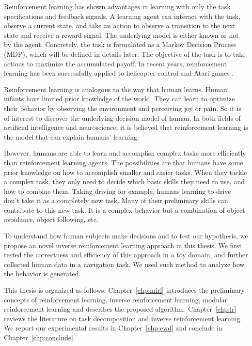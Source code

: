 Reinforcement learning has shown advantages in learning with only the task
specifications and feedback signals. A learning agent can interact with the
task, observe a current state, and take an action to observe a
transition to the next state and receive a reward signal. The underlying model is either
known or not by the agent. Concretely, the task is formulated as a
Markov Decision Process (MDP), which will be defined in details later.
The objective of the task is to take actions to maximize the accumulated payoff.
In recent years, reinforcement learning has been successfully applied to
helicopter control \cite{ng2006autonomous} and Atari games \cite{mnih2013playing}.

Reinforcement learning is analogous to the way that human learns. Human infants
have limited prior knowledge of the world. They can learn to optimize
their behavior by observing the environment and perceiving joy or pain. So it is
of interest to discover the underlying decision model of human. In both fields
of artificial intelligence and neuroscience, it is believed that reinforcement
learning is the model that can explain humans' learning.

However, humans are able to learn and accomplish complex tasks more efficiently than
reinforcement learning agents. The possibilities are that humans have some prior
knowledge on how to accomplish smaller and easier tasks. When they tackle a
complex task, they only need to decide which basic skills they need to use, and
how to combine them. Taking driving for example, humans learning to drive don't
take it as a completely new task. Many of their preliminary skills can
contribute to this new task. It is a complex behavior but a combination of
object avoidance, object following, etc.

To understand how human subjects make decisions and to test our hypothesis, we
propose an novel inverse reinforcement learning approach in this thesis.
We first tested the correctness and efficiency of this approach in a toy domain,
and further collected human data in a navigation task. We used such method
to analyze how the behavior is generated.

This thesis is organized as follows. Chapter~\ref{chp:mirl} introduces the
preliminary concepts of reinforcement learning, inverse reinforcement learning,
modular reinforcement learning and describes the proposed algorithm.
Chapter~\ref{chp:lr} reviews the literature on task decomposition and inverse
reinforcement learning. We report our experimental results in
Chapter~\ref{chp:eval} and conclude in Chapter~\ref{chp:conclude}.
